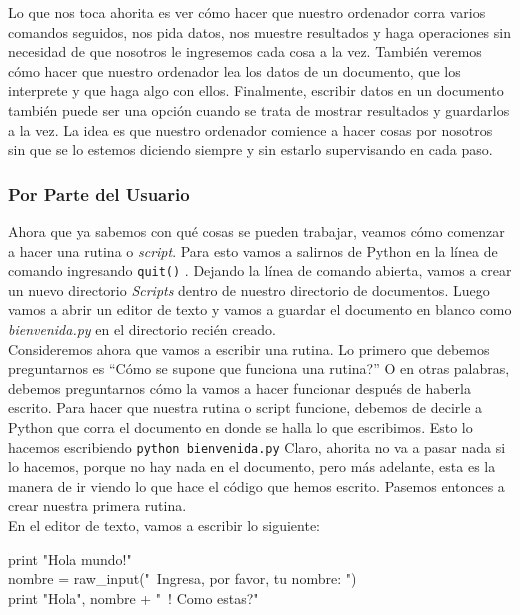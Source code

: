 \documentclass[10pt,letterpaper]{article}
\newcommand{\inlinecode}[1]{
\colorbox{light-gray}{\texttt{#1}}
}
\newenvironment{Code}
{
\begin{lrbox}{\selvestebox}%
\begin{minipage}{\dimexpr\columnwidth-2\fboxsep\relax}
\fontfamily{\ttdefault}\selectfont
}
{\end{minipage}\end{lrbox}%
\begin{center}
\colorbox{light-gray}{\usebox{\selvestebox}}
\end{center}
}
\begin{document}
Lo que nos toca ahorita es ver c\'omo hacer que nuestro ordenador corra varios comandos seguidos, nos pida datos, nos muestre resultados y haga operaciones sin necesidad de que nosotros le ingresemos cada cosa a la vez. Tambi\'en veremos c\'omo hacer que nuestro ordenador lea los datos de un documento, que los interprete y que haga algo con ellos. Finalmente, escribir datos en un documento tambi\'en puede ser una opci\'on cuando se trata de mostrar resultados y guardarlos a la vez. La idea es que nuestro ordenador comience a hacer cosas por nosotros sin que se lo estemos diciendo siempre y sin estarlo supervisando en cada paso.

\subsubsection{Por Parte del Usuario}
Ahora que ya sabemos con qu\'e cosas se pueden trabajar, veamos c\'omo comenzar a hacer una rutina o \textit{script}. Para esto vamos a salirnos de Python en la l\'inea de comando ingresando \inlinecode{quit()}. Dejando la l\'inea de comando abierta, vamos a crear un nuevo directorio \textit{Scripts} dentro de nuestro directorio de documentos. Luego vamos a abrir un editor de texto y vamos a guardar el documento en blanco como \textit{bienvenida.py} en el directorio reci\'en creado.\\

Consideremos ahora que vamos a escribir una rutina. Lo primero que debemos preguntarnos es ``C\'omo se supone que funciona una rutina?'' O en otras palabras, debemos preguntarnos c\'omo la vamos a hacer funcionar despu\'es de haberla escrito. Para hacer que nuestra rutina o script funcione, debemos de decirle a Python que corra el documento en donde se halla lo que escribimos. Esto lo hacemos escribiendo \inlinecode{python bienvenida.py} Claro, ahorita no va a pasar nada si lo hacemos, porque no hay nada en el documento, pero m\'as adelante, esta es la manera de ir viendo lo que hace el c\'odigo que hemos escrito. Pasemos entonces a crear nuestra primera rutina.\\

En el editor de texto, vamos a escribir lo siguiente:

\begin{Code}
print "Hola mundo!"\\
nombre = raw\_input("\ \hspace{-2mm}Ingresa, por favor, tu nombre: ")\\
print "Hola", nombre + "\ \hspace{-2mm}! Como estas?"
\end{Code}
\end{document}

